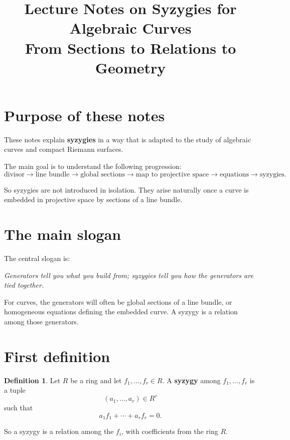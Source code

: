 \documentclass[11pt]{article}
\title{Lecture Notes on Syzygies for Algebraic Curves\\
	\large From Sections to Relations to Geometry}
\author{}
\date{}
\theoremstyle{definition}
\newtheorem{definition}[theorem]{Definition}
\theoremstyle{remark}
\begin{document}
	
	\maketitle
	
	\tableofcontents
	
	\section{Purpose of these notes}
	
	These notes explain \textbf{syzygies} in a way that is adapted to the study of algebraic curves and compact Riemann surfaces.
	
	The main goal is to understand the following progression:
	\[
	\text{divisor} \longrightarrow \text{line bundle} \longrightarrow \text{global sections}
	\longrightarrow \text{map to projective space} \longrightarrow \text{equations}
	\longrightarrow \text{syzygies}.
	\]
	
	So syzygies are not introduced in isolation. They arise naturally once a curve is embedded in projective space by sections of a line bundle.
	
	\section{The main slogan}
	
	The central slogan is:
	
	\begin{center}
		\emph{Generators tell you what you build from; syzygies tell you how the generators are tied together.}
	\end{center}
	
	For curves, the generators will often be global sections of a line bundle, or homogeneous equations defining the embedded curve. A syzygy is a relation among those generators.
	
	\section{First definition}
	
	\begin{definition}
		Let \(R\) be a ring and let \(f_1,\dots,f_r\in R\). A \textbf{syzygy} among \(f_1,\dots,f_r\) is a tuple
		\[
		(a_1,\dots,a_r)\in R^r
		\]
		such that
		\[
		a_1f_1+\cdots+a_rf_r=0.
		\]
	\end{definition}
	
	So a syzygy is a relation among the \(f_i\), with coefficients from the ring \(R\).
	
\end{document}

